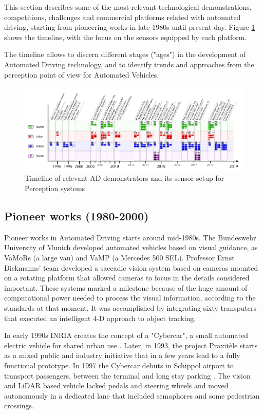 This section describes some of the most relevant technological demonstrations, competitions, challenges and commercial platforms related with automated driving, starting from pioneering works in late 1980s until present day. Figure \ref{fig:tech-demos} shows the timeline, with the focus on the sensors equipped by each platform.

The timeline allows to discern different stages ("ages") in the development of Automated Driving technology, and to identify trends and approaches from the perception point of view for Automated Vehicles.

\begin{figure}[p] %
  \centering
  \includegraphics[width=0.95\textheight,angle=90,keepaspectratio]{"img/AD_Timeline_2"}
  \caption{Timeline of relevant AD demonstrators and its sensor setup for 
      Perception systems}
  \label{fig:tech-demos}
\end{figure}

\subsection{Pioneer works (1980-2000)}

Pioneer works in Automated Driving starts around mid-1980s. The Bundeswehr 
University of Munich developed automated vehicles based on visual guidance, as 
VaMoRs \cite{Dickmanns1987} (a large van) and VaMP \cite{Gregor2002} (a 
Mercedes 500 SEL). Professor Ernst Dickmanns' team developed a saccadic vision 
system based on cameras mounted on a rotating platform that allowed cameras to 
focus in the details considered important.
These systems marked a milestone because of the huge amount of computational 
power needed to process the visual information, according to the standards at 
that moment. It was accomplished by integrating sixty transputers that executed 
an intelligent 4-D approach to object tracking.

In early 1990s INRIA creates the concept of a "Cybercar", a small automated 
electric vehicle for shared urban use \cite{Parent1993}. Later, in 1993, the project 
Praxitèle \cite{Massot1999} starts as a mixed public and industry initiative that in a 
few years lead to a fully functional prototype. 
In 1997 the Cybercar debuts in Schippol airport to transport passengers, between the terminal and long stay parking \cite{Ozguner2007}. The vision and LiDAR based vehicle lacked pedals and steering wheels and moved autonomously in a dedicated lane that included semaphores and some pedestrian crossings.


